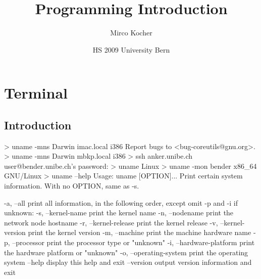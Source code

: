 \documentclass[10pt,a4paper]{scrartcl}
\date{HS 2009 University Bern}
\author{Mirco Kocher}
\title{Programming Introduction}
\begin{document}
\section{Terminal}
\subsection{Introduction}
\begin{terminalcode}
> uname -mns
  Darwin imac.local i386
  Report bugs to <bug-coreutils@gnu.org>.
> uname -mns
  Darwin mbkp.local i386
> ssh anker.unibe.ch
  user@bender.unibe.ch's password: 
> uname
  Linux
> uname -mon
  bender x86_64 GNU/Linux
> uname --help
  Usage: uname [OPTION]...
  Print certain system information.  With no OPTION, same as -s.
  
    -a, --all                print all information, in the following order,
                               except omit -p and -i if unknown:
    -s, --kernel-name        print the kernel name
    -n, --nodename           print the network node hostname
    -r, --kernel-release     print the kernel release
    -v, --kernel-version     print the kernel version
    -m, --machine            print the machine hardware name
    -p, --processor          print the processor type or "unknown"
    -i, --hardware-platform  print the hardware platform or "unknown"
    -o, --operating-system   print the operating system
        --help     display this help and exit
        --version  output version information and exit
\end{terminalcode}

\end{document}
